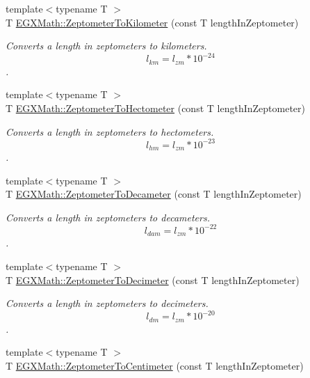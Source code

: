\begin{DoxyCompactItemize}
{\footnotesize template$<$typename T $>$ }\\T \mbox{\hyperlink{group___e_g_x_math-_conversions-_length_conversions-_zeptometer-_s_i_ga687dc5d33c63561c87a06568fd928da9}{E\+G\+X\+Math\+::\+Zeptometer\+To\+Kilometer}} (const T length\+In\+Zeptometer)
\begin{DoxyCompactList}\small\item\em Converts a length in zeptometers to kilometers. \[ l_{km}=l_{zm} * 10^{-24} \]. \end{DoxyCompactList}\item 
{\footnotesize template$<$typename T $>$ }\\T \mbox{\hyperlink{group___e_g_x_math-_conversions-_length_conversions-_zeptometer-_s_i_ga4f9724a5c86f9e85aee3bad4d04a7faa}{E\+G\+X\+Math\+::\+Zeptometer\+To\+Hectometer}} (const T length\+In\+Zeptometer)
\begin{DoxyCompactList}\small\item\em Converts a length in zeptometers to hectometers. \[ l_{hm}=l_{zm} * 10^{-23} \]. \end{DoxyCompactList}\item 
{\footnotesize template$<$typename T $>$ }\\T \mbox{\hyperlink{group___e_g_x_math-_conversions-_length_conversions-_zeptometer-_s_i_ga4076e322cf0f16f1eb977409e4f8f251}{E\+G\+X\+Math\+::\+Zeptometer\+To\+Decameter}} (const T length\+In\+Zeptometer)
\begin{DoxyCompactList}\small\item\em Converts a length in zeptometers to decameters. \[ l_{dam}=l_{zm} * 10^{-22} \]. \end{DoxyCompactList}\item 
{\footnotesize template$<$typename T $>$ }\\T \mbox{\hyperlink{group___e_g_x_math-_conversions-_length_conversions-_zeptometer-_s_i_ga9a25b6696c3f6ed8df86a77e1da46830}{E\+G\+X\+Math\+::\+Zeptometer\+To\+Decimeter}} (const T length\+In\+Zeptometer)
\begin{DoxyCompactList}\small\item\em Converts a length in zeptometers to decimeters. \[ l_{dm}=l_{zm} * 10^{-20} \]. \end{DoxyCompactList}\item 
{\footnotesize template$<$typename T $>$ }\\T \mbox{\hyperlink{group___e_g_x_math-_conversions-_length_conversions-_zeptometer-_s_i_ga11d9546ba555e2fca128d6c905fed139}{E\+G\+X\+Math\+::\+Zeptometer\+To\+Centimeter}} (const T length\+In\+Zeptometer)

\end{DoxyCompactItemize}
